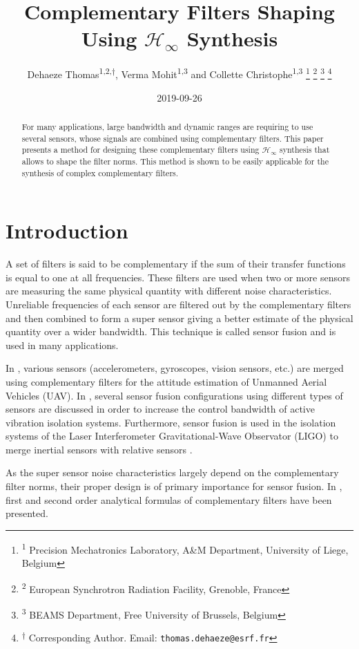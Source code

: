 \documentclass[letterpaper, 10 pt, conference]{ieeeconf}
\author{Dehaeze Thomas\textsuperscript{1,2,$\dagger$}, Verma Mohit\textsuperscript{1,3} and Collette Christophe\textsuperscript{1,3}  \thanks{\textsuperscript{1} Precision Mechatronics Laboratory, A\&M Department, University of Liege, Belgium} \thanks{\textsuperscript{2} European Synchrotron Radiation Facility, Grenoble, France} \thanks{\textsuperscript{3} BEAMS Department, Free University of Brussels, Belgium} \thanks{\textsuperscript{$\dagger$} Corresponding Author. Email: {\tt\small thomas.dehaeze@esrf.fr}}}
\date{2019-09-26}
\title{Complementary Filters Shaping Using \(\mathcal{H}_\infty\) Synthesis}
\begin{document}
\maketitle


\begin{abstract}
For many applications, large bandwidth and dynamic ranges are requiring to use several sensors, whose signals are combined using complementary filters.
This paper presents a method for designing these complementary filters using \(\mathcal{H}_\infty\) synthesis that allows to shape the filter norms.
This method is shown to be easily applicable for the synthesis of complex complementary filters.
\end{abstract}

\section{Introduction}
\label{sec:org239b4b4}
\label{sec:introduction}
A set of filters is said to be complementary if the sum of their transfer functions is equal to one at all frequencies.
These filters are used when two or more sensors are measuring the same physical quantity with different noise characteristics. Unreliable frequencies of each sensor are filtered out by the complementary filters and then combined to form a super sensor giving a better estimate of the physical quantity over a wider bandwidth.
This technique is called sensor fusion and is used in many applications.\par
In \cite{zimmermann92_high_bandw_orien_measur_contr,corke04_inert_visual_sensin_system_small_auton_helic,min15_compl_filter_desig_angle_estim}, various sensors (accelerometers, gyroscopes, vision sensors, etc.) are merged using complementary filters for the attitude estimation of Unmanned Aerial Vehicles (UAV).
In \cite{collette15_sensor_fusion_method_high_perfor}, several sensor fusion configurations using different types of sensors are discussed in order to increase the control bandwidth of active vibration isolation systems.
Furthermore, sensor fusion is used in the isolation systems of the Laser Interferometer Gravitational-Wave Observator (LIGO) to merge inertial sensors with relative sensors
\cite{matichard15_seism_isolat_advan_ligo,hua04_polyp_fir_compl_filter_contr_system}. \par
As the super sensor noise characteristics largely depend on the complementary filter norms, their proper design is of primary importance for sensor fusion.
In \cite{corke04_inert_visual_sensin_system_small_auton_helic,jensen13_basic_uas,min15_compl_filter_desig_angle_estim}, first and second order analytical formulas of complementary filters have been presented.
\end{document}
